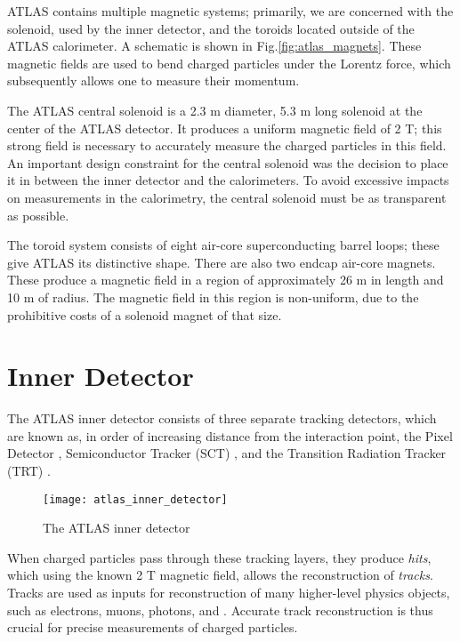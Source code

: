 ATLAS contains multiple magnetic systems; primarily, we are concerned with the solenoid, used by the inner detector, and the toroids located outside of the ATLAS calorimeter.
A schematic is shown in Fig.\ref{fig:atlas_magnets}.
These magnetic fields are used to bend charged particles under the Lorentz force, which subsequently allows one to measure their momentum.

The ATLAS central solenoid \cite{Yamamoto:2008zze} is a 2.3 m diameter, 5.3 m long solenoid at the center of the ATLAS detector.
It produces a uniform magnetic field of 2 T; this strong field is necessary to accurately measure the charged particles in this field.
An important design constraint for the central solenoid was the decision to place it in between the inner detector and the calorimeters.
To avoid excessive impacts on measurements in the calorimetry, the central solenoid must be as transparent as possible\footnotemark.

The toroid system consists of eight air-core superconducting barrel loops; these give ATLAS its distinctive shape.
There are also two endcap air-core magnets.
These produce a magnetic field in a region of approximately 26 m in length and 10 m of radius.
The magnetic field in this region is non-uniform, due to the prohibitive costs of a solenoid magnet of that size.

\section{Inner Detector}

The ATLAS inner detector consists of three separate tracking detectors, which are known as, in order of increasing distance from the interaction point, the Pixel Detector \cite{Takubo:2014qsa}, Semiconductor Tracker (SCT) , and the Transition Radiation Tracker (TRT) .
\begin{figure}
\caption{The ATLAS inner detector} \label{fig:atlas_inner_detector}
\texttt{[image: atlas\_inner\_detector]}
\end{figure}
When charged particles pass through these tracking layers, they produce \textit{hits}, which using the known 2 T magnetic field, allows the reconstruction of \textit{tracks}.
Tracks are used as inputs for reconstruction of many higher-level physics objects, such as electrons, muons, photons, and \met.
Accurate track reconstruction is thus crucial for precise measurements of charged particles.

